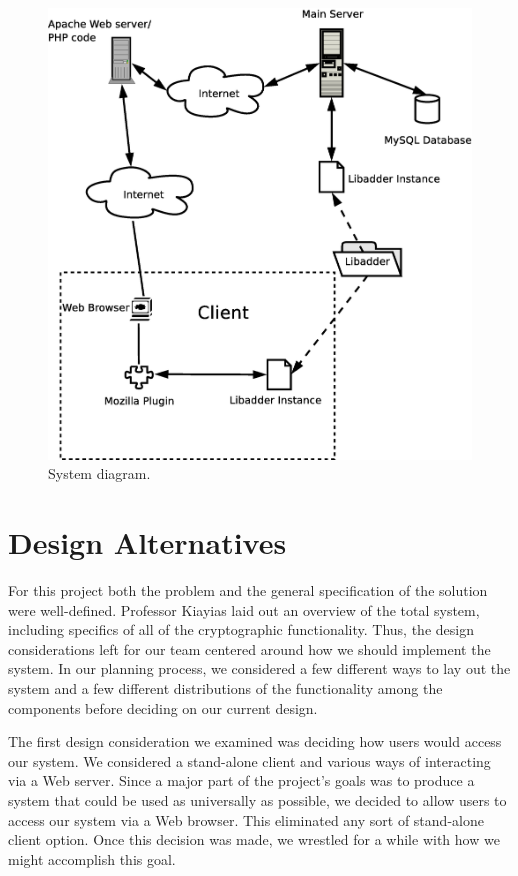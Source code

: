 \documentclass[letterpaper,10pt]{article}
\begin{document}
\begin{center}
  \begin{figure}
    \includegraphics[scale=0.40]{diagram.eps}
    \caption{System diagram.}
    \label{fig:diagram}
  \end{figure}
\end{center}

\section{Design Alternatives}

For this project both the problem and the general specification of the
solution were well-defined. Professor Kiayias laid out an overview of
the total system, including specifics of all of the cryptographic
functionality. Thus, the design considerations left for our team
centered around how we should implement the system. In our planning
process, we considered a few different ways to lay out the system and
a few different distributions of the functionality among the
components before deciding on our current design.

The first design consideration we examined was deciding how users
would access our system. We considered a stand-alone client and
various ways of interacting via a Web server. Since a major part of the
project's goals was to produce a system that could be used as
universally as possible, we decided to allow users to access our
system via a Web browser. This eliminated any sort of stand-alone
client option. Once this decision was made, we wrestled for a while
with how we might accomplish this goal.
\end{document}
